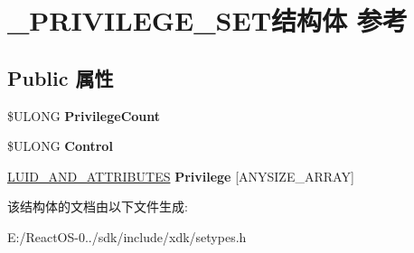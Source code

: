 \hypertarget{struct___p_r_i_v_i_l_e_g_e___s_e_t}{}\section{\+\_\+\+P\+R\+I\+V\+I\+L\+E\+G\+E\+\_\+\+S\+E\+T结构体 参考}
\label{struct___p_r_i_v_i_l_e_g_e___s_e_t}
\subsection*{Public 属性}
\begin{DoxyCompactItemize}
\item 
\mbox{\label{struct___p_r_i_v_i_l_e_g_e___s_e_t_afed5f433a0df4c9e3c9cce0ae8b7bdda}} 
\$U\+L\+O\+NG {\bfseries Privilege\+Count}
\item 
\mbox{\label{struct___p_r_i_v_i_l_e_g_e___s_e_t_a724dfd096010b615ff79ba3dd9b6b8f5}} 
\$U\+L\+O\+NG {\bfseries Control}
\item 
\mbox{\label{struct___p_r_i_v_i_l_e_g_e___s_e_t_a19ff8e350afcb8b62f12c47c57e6bb0e}} 
\hyperlink{struct___l_u_i_d___a_n_d___a_t_t_r_i_b_u_t_e_s}{L\+U\+I\+D\+\_\+\+A\+N\+D\+\_\+\+A\+T\+T\+R\+I\+B\+U\+T\+ES} {\bfseries Privilege} \mbox{[}A\+N\+Y\+S\+I\+Z\+E\+\_\+\+A\+R\+R\+AY\mbox{]}
\end{DoxyCompactItemize}


该结构体的文档由以下文件生成\+:\begin{DoxyCompactItemize}
\item 
E\+:/\+React\+O\+S-\/0../sdk/include/xdk/setypes.\+h\end{DoxyCompactItemize}
